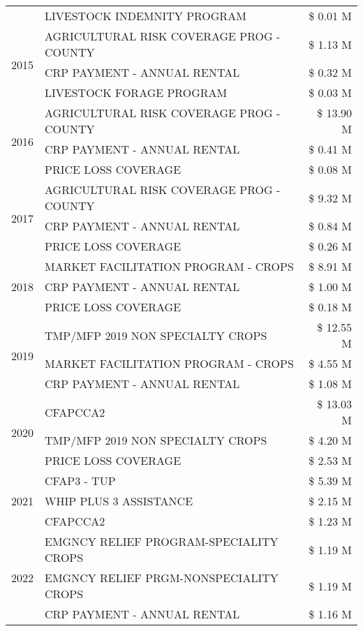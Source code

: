 \begin{tabular}{llr}
 & LIVESTOCK INDEMNITY PROGRAM & \$ 0.01 M \\
\cline{1-3}
\multirow[t]{3}{*}{2015} & AGRICULTURAL RISK COVERAGE PROG - COUNTY & \$ 1.13 M \\
 & CRP PAYMENT - ANNUAL RENTAL & \$ 0.32 M \\
 & LIVESTOCK FORAGE PROGRAM & \$ 0.03 M \\
\cline{1-3}
\multirow[t]{3}{*}{2016} & AGRICULTURAL RISK COVERAGE PROG - COUNTY & \$ 13.90 M \\
 & CRP PAYMENT - ANNUAL RENTAL & \$ 0.41 M \\
 & PRICE LOSS COVERAGE & \$ 0.08 M \\
\cline{1-3}
\multirow[t]{3}{*}{2017} & AGRICULTURAL RISK COVERAGE PROG - COUNTY & \$ 9.32 M \\
 & CRP PAYMENT - ANNUAL RENTAL & \$ 0.84 M \\
 & PRICE LOSS COVERAGE & \$ 0.26 M \\
\cline{1-3}
\multirow[t]{3}{*}{2018} & MARKET FACILITATION PROGRAM - CROPS & \$ 8.91 M \\
 & CRP PAYMENT - ANNUAL RENTAL & \$ 1.00 M \\
 & PRICE LOSS COVERAGE & \$ 0.18 M \\
\cline{1-3}
\multirow[t]{3}{*}{2019} & TMP/MFP 2019 NON SPECIALTY CROPS & \$ 12.55 M \\
 & MARKET FACILITATION PROGRAM - CROPS & \$ 4.55 M \\
 & CRP PAYMENT - ANNUAL RENTAL & \$ 1.08 M \\
\cline{1-3}
\multirow[t]{3}{*}{2020} & CFAPCCA2 & \$ 13.03 M \\
 & TMP/MFP 2019 NON SPECIALTY CROPS & \$ 4.20 M \\
 & PRICE LOSS COVERAGE & \$ 2.53 M \\
\cline{1-3}
\multirow[t]{3}{*}{2021} & CFAP3 - TUP & \$ 5.39 M \\
 & WHIP PLUS 3 ASSISTANCE & \$ 2.15 M \\
 & CFAPCCA2 & \$ 1.23 M \\
\cline{1-3}
\multirow[t]{3}{*}{2022} & EMGNCY RELIEF PROGRAM-SPECIALITY CROPS & \$ 1.19 M \\
 & EMGNCY RELIEF PRGM-NONSPECIALITY CROPS & \$ 1.19 M \\
 & CRP PAYMENT - ANNUAL RENTAL & \$ 1.16 M \\
\cline{1-3}
\bottomrule
\end{tabular}
